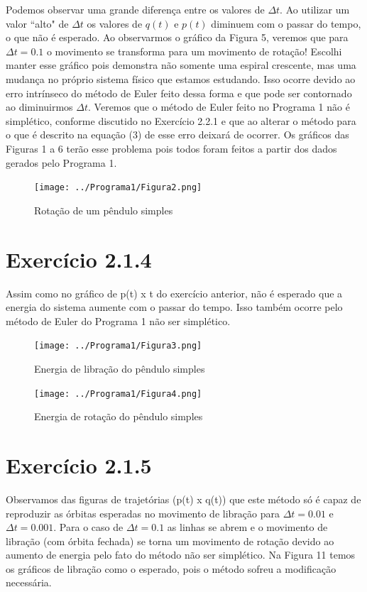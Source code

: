\documentclass[a4paper,10pt]{article}
\begin{document}
  Podemos observar uma grande diferença entre os valores de $\Delta t$. Ao utilizar um valor ``alto" \; de $\Delta t$ os valores
de $q(t)$ e $p(t)$ diminuem com o passar do tempo, o que não é esperado. Ao observarmos o gráfico da Figura 5, veremos que para $\Delta t = 0.1$
o movimento se transforma para um movimento de rotação! Escolhi manter esse gráfico pois demonstra não somente uma espiral crescente, mas uma
mudança no próprio sistema físico que estamos estudando. Isso ocorre devido ao erro intrínseco do método de Euler feito dessa forma e que pode
ser contornado ao diminuirmos $\Delta t$. Veremos que o método de Euler feito no Programa 1 não é simplético, conforme discutido no Exercício
2.2.1 e que ao alterar o método para o que é descrito na equação (3) de \cite{estudodirigido1} esse erro deixará de ocorrer. Os gráficos das
Figuras 1 a 6 terão esse problema pois todos foram feitos a partir dos dados gerados pelo Programa 1.

  \begin{figure}[H]
    \centering
    \texttt{[image: ../Programa1/Figura2.png]}
    \caption{Rotação de um pêndulo simples}
  \end{figure}

\section*{Exercício 2.1.4}

Assim como no gráfico de p(t) x t do exercício anterior, não é esperado que a energia do sistema aumente com o passar do tempo.
Isso também ocorre pelo método de Euler do Programa 1 não ser simplético.

  \begin{figure}[H]
    \centering
    \texttt{[image: ../Programa1/Figura3.png]}
    \caption{Energia de libração do pêndulo simples}
  \end{figure}

  \begin{figure}[H]
    \centering
    \texttt{[image: ../Programa1/Figura4.png]}
    \caption{Energia de rotação do pêndulo simples}
  \end{figure}

\section*{Exercício 2.1.5}

 Observamos das figuras de trajetórias (p(t) x q(t)) que este método só é capaz de reproduzir as órbitas esperadas
no movimento de libração para $\Delta t = 0.01$ e $\Delta t = 0.001$. Para o caso de $\Delta t = 0.1$ as linhas se abrem e
o movimento de libração (com órbita fechada) se torna um movimento de rotação devido ao aumento de energia pelo fato do método
não ser simplético. Na Figura 11 temos os gráficos de libração como o esperado, pois o método sofreu a modificação necessária.
\end{document}
